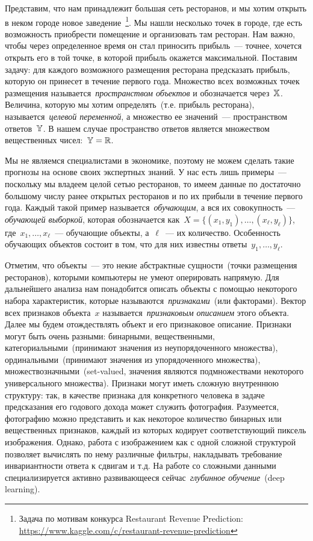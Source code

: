 \documentclass[12pt,fleqn]{article}
\begin{document}
Представим, что нам принадлежит большая сеть ресторанов, и мы хотим открыть в неком
городе новое заведение~\footnote{Задача по мотивам конкурса Restaurant Revenue Prediction:
\url{https://www.kaggle.com/c/restaurant-revenue-prediction}}.
Мы нашли несколько точек в городе, где есть возможность
приобрести помещение и организовать там ресторан.
Нам важно, чтобы через определенное время он стал приносить прибыль~---
точнее, хочется открыть его в той точке, в которой прибыль окажется максимальной.
Поставим задачу: для каждого возможного размещения ресторана предсказать
прибыль, которую он принесет в течение первого года.
Множество всех возможных точек размещения называется~\emph{пространством объектов}
и обозначается через~$\mathbb{X}$.
Величина, которую мы хотим определять~(т.е. прибыль ресторана),
называется~\emph{целевой переменной}, а множество ее значений~---
пространством ответов~$\mathbb{Y}$.
В нашем случае пространство ответов является множеством вещественных
чисел:~$\mathbb{Y} = \mathbb{R}$.

Мы не являемся специалистами в экономике, поэтому не можем сделать такие
прогнозы на основе своих экспертных знаний.
У нас есть лишь примеры~--- поскольку мы владеем целой сетью ресторанов,
то имеем данные по достаточно большому числу ранее открытых ресторанов и по их
прибыли в течение первого года.
Каждый такой пример называется~\emph{обучающим}, а вся их совокупность~---
\emph{обучающей выборкой}, которая обозначается как~$X = \{(x_1, y_1), \dots, (x_\ell, y_\ell)\}$,
где~$x_1, \dots, x_\ell$~--- обучающие объекты, а~$\ell$~--- их количество.
Особенность обучающих объектов состоит в том, что для них известны ответы~$y_1, \dots, y_\ell$.

Отметим, что объекты~--- это некие абстрактные сущности~(точки размещения ресторанов),
которыми компьютеры не умеют оперировать напрямую.
Для дальнейшего анализа нам понадобится описать объекты с помощью некоторого
набора характеристик, которые называются~\emph{признаками}~(или факторами).
Вектор всех признаков объекта~$x$ называется~\emph{признаковым описанием}
этого объекта.
Далее мы будем отождествлять объект и его признаковое описание.
Признаки могут быть очень разными: бинарными, вещественными, категориальными~(принимают
значения из неупорядоченного множества), ординальными~(принимают значения
из упорядоченного множества), множествозначными~(set-valued, значения
являются подмножествами некоторого универсального множества).
Признаки могут иметь сложную внутреннюю структуру: так, в качестве признака для конкретного человека
в задаче предсказания его годового дохода может служить фотография.
Разумеется, фотографию можно представить и как некоторое количество бинарных
или вещественных признаков, каждый из которых кодирует соответствующий пиксель изображения.
Однако, работа с изображением как с одной сложной структурой позволяет
вычислять по нему различные фильтры, накладывать требование инвариантности
ответа к сдвигам и т.д.
На работе со сложными данными специализируется активно развивающееся
сейчас~\emph{глубинное обучение}~(deep learning).
\end{document}
